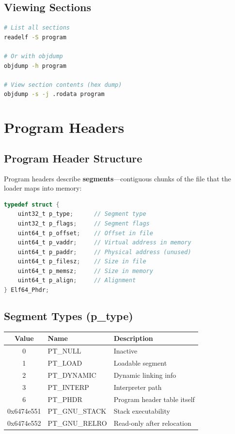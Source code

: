 \subsection{Viewing Sections}

\begin{lstlisting}[language=bash]
# List all sections
readelf -S program

# Or with objdump
objdump -h program

# View section contents (hex dump)
objdump -s -j .rodata program
\end{lstlisting}

\section{Program Headers}

\subsection{Program Header Structure}

Program headers describe \textbf{segments}—contiguous chunks of the file that the loader maps into memory:

\begin{lstlisting}[language=C]
typedef struct {
    uint32_t p_type;      // Segment type
    uint32_t p_flags;     // Segment flags
    uint64_t p_offset;    // Offset in file
    uint64_t p_vaddr;     // Virtual address in memory
    uint64_t p_paddr;     // Physical address (unused)
    uint64_t p_filesz;    // Size in file
    uint64_t p_memsz;     // Size in memory
    uint64_t p_align;     // Alignment
} Elf64_Phdr;
\end{lstlisting}

\subsection{Segment Types (p\_type)}

\begin{tabular}{|c|l|l|}
\hline
\textbf{Value} & \textbf{Name} & \textbf{Description} \\
\hline
0 & PT\_NULL & Inactive \\
\hline
1 & PT\_LOAD & Loadable segment \\
\hline
2 & PT\_DYNAMIC & Dynamic linking info \\
\hline
3 & PT\_INTERP & Interpreter path \\
\hline
6 & PT\_PHDR & Program header table itself \\
\hline
0x6474e551 & PT\_GNU\_STACK & Stack executability \\
\hline
0x6474e552 & PT\_GNU\_RELRO & Read-only after relocation \\
\hline
\end{tabular}

